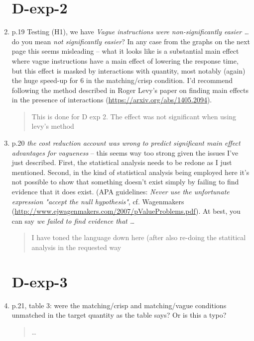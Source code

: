 \documentclass{tufte-handout}
\begin{document}
\begin{enumerate}
\section{D-exp-2}

\item p.19 Testing (H1), we have \emph{Vague instructions were non-significantly easier \ldots} do you mean \emph{not significantly easier}? In any case from the graphs on the next page this seems misleading -- what it looks like is a substantial main effect where vague instructions have a main effect of lowering the response time, but this effect is masked by interactions with quantity, most notably (again) the huge speed-up for 6 in the matching/crisp condition. I'd recommend following the method described in Roger Levy's paper on finding main effects in the presence of interactions (\url{https://arxiv.org/abs/1405.2094}).
\begin{quote}This is done for D exp 2. The effect was not significant when using levy's method\end{quote}

\item p.20 \emph{the cost reduction account was wrong to predict significant main effect advantages for vagueness} -- this seems way too strong given the issues I've just described. First, the statistical analysis needs to be redone as I just mentioned. Second, in the kind of statistical analysis being employed here it's not possible to show that something doesn't exist simply by failing to find evidence that it does exist. (APA guidelines: \emph{Never use the unfortunate expression "accept the null hypothesis"}, cf. Wagenmakers (\url{http://www.ejwagenmakers.com/2007/pValueProblems.pdf}). At best, you can say \emph{we failed to find evidence that \ldots}
\begin{quote}I have toned the language down here (after also re-doing the statitical analysis in the requested way\end{quote}

\section{D-exp-3}

\item p.21, table 3: were the matching/crisp and matching/vague conditions unmatched in the target quantity as the table says? Or is this a typo?
\begin{quote}\ldots\end{quote}


\end{enumerate}
\end{document}
